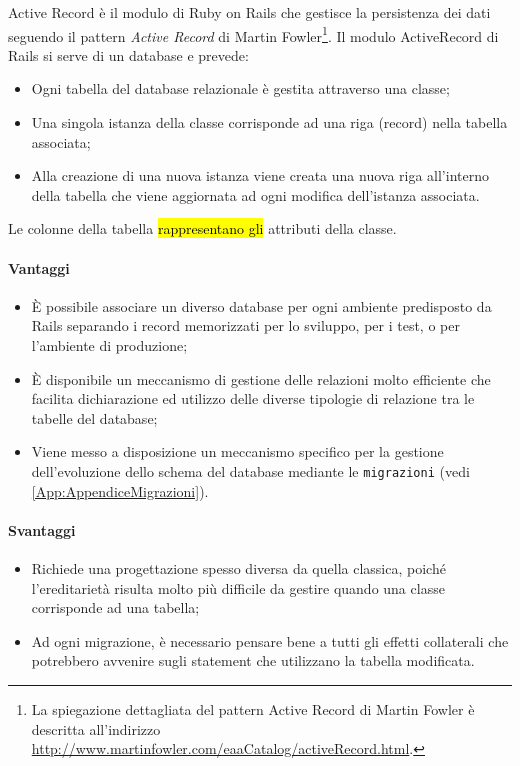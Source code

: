 \label{sec:ActiveRecord}
Active Record è il modulo di Ruby on Rails che gestisce la persistenza dei dati seguendo il pattern \textit{Active Record }di Martin Fowler\footnote{La spiegazione dettagliata del pattern Active Record di Martin Fowler è descritta all'indirizzo \url{http://www.martinfowler.com/eaaCatalog/activeRecord.html}. }. 
Il modulo ActiveRecord di Rails si serve di un database e prevede:
\begin{itemize}
\item Ogni tabella del database relazionale è gestita attraverso una classe;
\item Una singola istanza della classe corrisponde ad una riga (record) nella tabella associata;
\item Alla creazione di una nuova istanza viene creata una nuova riga all'interno della tabella che viene aggiornata ad ogni modifica dell'istanza associata.
\end{itemize}
Le colonne della tabella \hl{rappresentano gli} attributi della classe.

\paragraph{Vantaggi} 
\begin{itemize}
	\item È possibile associare un diverso database per ogni ambiente predisposto da Rails separando i record memorizzati per lo sviluppo, per i test, o per l'ambiente di produzione;
	\item È disponibile un meccanismo di gestione delle relazioni molto efficiente che facilita dichiarazione ed utilizzo delle diverse tipologie di relazione tra le tabelle del database;
	\item Viene messo a disposizione un meccanismo specifico per la gestione dell'evoluzione dello schema del database mediante le \texttt{migrazioni} (vedi \autoref{App:AppendiceMigrazioni}). 
\end{itemize} 
\paragraph{Svantaggi}
\begin{itemize}
	\item Richiede una progettazione spesso diversa da quella classica, poiché l'ereditarietà risulta molto più difficile da gestire quando una classe corrisponde ad una tabella;
	\item Ad ogni migrazione, è necessario pensare bene a tutti gli effetti collaterali che potrebbero avvenire sugli statement che utilizzano la tabella modificata.
\end{itemize} 

